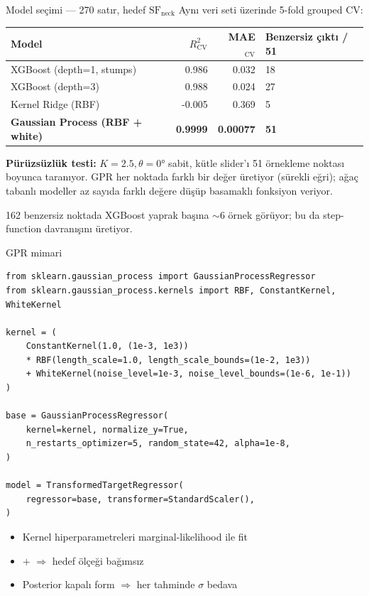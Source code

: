 \begin{frame}{Model seçimi --- 270 satır, hedef \(\mathrm{SF}_{\text{neck}}\)}
  Aynı veri seti üzerinde 5-fold grouped CV:
  \begin{center}\footnotesize
    \begin{tabular}{lrrl}
      \toprule
      Model & \(R^2_{\text{CV}}\) & MAE\(_{\text{CV}}\) & Benzersiz çıktı / 51 \\
      \midrule
      XGBoost (depth=1, stumps) & 0.986 & 0.032 & 18 \\
      XGBoost (depth=3)         & 0.988 & 0.024 & 27 \\
      Kernel Ridge (RBF)        & -0.005 & 0.369 & 5 \\
      \alert{\textbf{Gaussian Process (RBF + white)}} & \alert{\textbf{0.9999}} & \alert{\textbf{0.00077}} & \alert{\textbf{51}} \\
      \bottomrule
    \end{tabular}
  \end{center}

  \vspace{0.4cm}
  \textbf{Pürüzsüzlük testi:} \(K=2.5, \theta=0°\) sabit, kütle slider'ı
  51 örnekleme noktası boyunca taranıyor. GPR her noktada farklı bir
  değer üretiyor (sürekli eğri); ağaç tabanlı modeller az sayıda
  farklı değere düşüp \alert{basamaklı} fonksiyon veriyor.

  \vspace{0.3cm}
  \footnotesize
  162 benzersiz noktada XGBoost yaprak başına \(\sim 6\) örnek görüyor;
  bu da step-function davranışını üretiyor.
\end{frame}

\begin{frame}[fragile]{GPR mimari}
\begin{lstlisting}
from sklearn.gaussian_process import GaussianProcessRegressor
from sklearn.gaussian_process.kernels import RBF, ConstantKernel, WhiteKernel

kernel = (
    ConstantKernel(1.0, (1e-3, 1e3))
    * RBF(length_scale=1.0, length_scale_bounds=(1e-2, 1e3))
    + WhiteKernel(noise_level=1e-3, noise_level_bounds=(1e-6, 1e-1))
)

base = GaussianProcessRegressor(
    kernel=kernel, normalize_y=True,
    n_restarts_optimizer=5, random_state=42, alpha=1e-8,
)

model = TransformedTargetRegressor(
    regressor=base, transformer=StandardScaler(),
)
\end{lstlisting}

  \begin{itemize}\small
    \item Kernel hiperparametreleri marginal-likelihood ile fit
    \item {} \(+\)  \(\Rightarrow\) hedef ölçeği bağımsız
    \item Posterior kapalı form \(\Rightarrow\) her tahminde \(\sigma\) bedava
  \end{itemize}
\end{frame}

